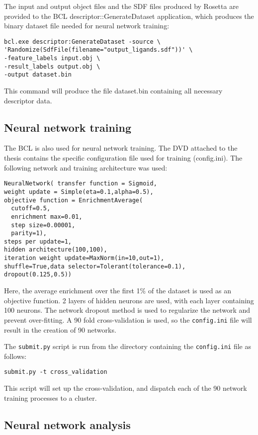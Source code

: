 The input and output object files and the \ac{SDF} files produced by Rosetta are provided to the \ac{BCL} descriptor::GenerateDataset application, which produces the binary dataset file needed for neural network training:
\singlespace
\begin{verbatim}
bcl.exe descriptor:GenerateDataset -source \
'Randomize(SdfFile(filename="output_ligands.sdf"))' \
-feature_labels input.obj \
-result_labels output.obj \
-output dataset.bin
\end{verbatim}
\doublespace

This command will produce the file dataset.bin containing all necessary descriptor data.

\subsection{Neural network training}

The \ac{BCL} is also used for neural network training.
The DVD attached to the thesis contains the specific configuration file used for training (config.ini).
The following network and training architecture was used:
\singlespace
\begin{verbatim}
NeuralNetwork( transfer function = Sigmoid,
weight update = Simple(eta=0.1,alpha=0.5),
objective function = EnrichmentAverage(
  cutoff=0.5,
  enrichment max=0.01,
  step size=0.00001,
  parity=1),
steps per update=1, 
hidden architecture(100,100),
iteration weight update=MaxNorm(in=10,out=1),
shuffle=True,data selector=Tolerant(tolerance=0.1),
dropout(0.125,0.5))
\end{verbatim}
\doublespace
Here, the average enrichment over the first 1\% of the dataset is used as an objective function.
2 layers of hidden neurons are used, with each layer containing 100 neurons. 
The network dropout method \citep{Hinton:2012tv} is used to regularize the network and prevent over-fitting.
A 90 fold cross-validation is used, so the \texttt{config.ini} file will result in the creation of 90 networks.

The \texttt{submit.py} script is run from the directory containing the \texttt{config.ini} file as follows:
\singlespace
\begin{verbatim}
submit.py -t cross_validation
\end{verbatim}
\doublespace
This script will set up the cross-validation, and dispatch each of the 90 network training processes to a cluster.
\subsection{Neural network analysis}

